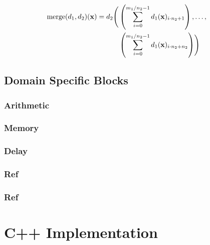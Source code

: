 \begin{minipage}{0.5\linewidth}
  \begin{prooftree}
  \end{prooftree}
  \begin{align*}
    \Merge(d_1, d_2)(\mathbf{x})                ={} &
    \begin{aligned}[t]
      d_2\Biggl( & \left(\sum^{{m_1}/{n_2} - 1}_{i=0}d_1(\mathbf{x})_{i \cdot n_2 + 1}\right), \dots,    \\
                 & \left(\sum^{{m_1}/{n_2} - 1}_{i=0}d_1(\mathbf{x})_{i \cdot n_2 + n_2}\right)  \Biggr)
    \end{aligned}
  \end{align*}
\end{minipage}
\begin{minipage}{0.5\linewidth}
  \begin{figure}[H]
    \centering
    \label{fig:block_merge}
    
  \end{figure}
\end{minipage}

\subsection{Domain Specific Blocks}

\subsubsection{Arithmetic}
\subsubsection{Memory}
\subsubsection{Delay}
\subsubsection{Ref}
\subsubsection{Ref}

\section{C++ Implementation}

